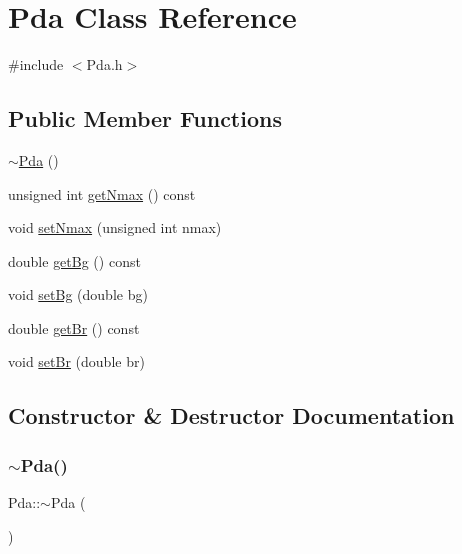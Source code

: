 \hypertarget{class_pda}{}\section{Pda Class Reference}
\label{class_pda}


{\ttfamily \#include $<$Pda.\+h$>$}

\subsection*{Public Member Functions}
\begin{DoxyCompactItemize}
\item 
\hyperlink{class_pda_a9c72f6be70a8718284328f735b79374c}{$\sim$\+Pda} ()
\item 
unsigned int \hyperlink{class_pda_aca50144f22170263ef05997e5eefeff6}{get\+Nmax} () const
\item 
void \hyperlink{class_pda_a76f55e8d719aaace0f26ed1b47ed0bb4}{set\+Nmax} (unsigned int nmax)
\item 
double \hyperlink{class_pda_a769d8bdf3a739d421e226e126aae2d42}{get\+Bg} () const
\item 
void \hyperlink{class_pda_a64baea621f7aef17b43ee65b2a0c0aff}{set\+Bg} (double bg)
\item 
double \hyperlink{class_pda_adc2d16391e665139ea51a3489e7d8e3c}{get\+Br} () const
\item 
void \hyperlink{class_pda_a8890b9df42265440d7ce534bb8a95887}{set\+Br} (double br)
\end{DoxyCompactItemize}


\subsection{Constructor \& Destructor Documentation}
\mbox{\label{class_pda_a9c72f6be70a8718284328f735b79374c}} 
\subsubsection{\texorpdfstring{$\sim$\+Pda()}{~Pda()}}
{\footnotesize\ttfamily Pda\+::$\sim$\+Pda (\begin{DoxyParamCaption}{ }\end{DoxyParamCaption})\hspace{0.3cm}{\ttfamily [inline]}}



